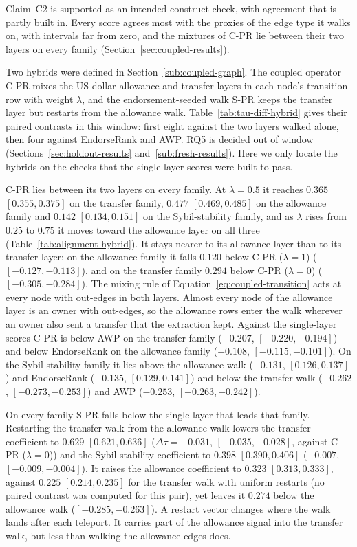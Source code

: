 Claim~C2 is supported as an intended-construct check, with agreement that is partly built in. Every score agrees most with the proxies of the edge type it walks on, with intervals far from zero, and the mixtures of C-PR lie between their two layers on every family (Section~\ref{sec:coupled-results}).


Two hybrids were defined in Section~\ref{sub:coupled-graph}. The coupled operator C-PR mixes the US-dollar allowance and transfer layers in each node's transition row with weight $\lambda$, and the endorsement-seeded walk S-PR keeps the transfer layer but restarts from the allowance walk. Table~\ref{tab:tau-diff-hybrid} gives their paired contrasts in this window: first eight against the two layers walked alone, then four against EndorseRank and AWP. RQ5 is decided out of window (Sections~\ref{sec:holdout-results} and~\ref{sub:fresh-results}). Here we only locate the hybrids on the checks that the single-layer scores were built to pass.



C-PR lies between its two layers on every family. At $\lambda=0.5$ it reaches $0.365$ $[0.355,0.375]$ on the transfer family, $0.477$ $[0.469,0.485]$ on the allowance family and $0.142$ $[0.134,0.151]$ on the Sybil-stability family, and as $\lambda$ rises from $0.25$ to $0.75$ it moves toward the allowance layer on all three (Table~\ref{tab:alignment-hybrid}). It stays nearer to its allowance layer than to its transfer layer: on the allowance family it falls $0.120$ below C-PR ($\lambda=1$) ($[-0.127,-0.113]$), and on the transfer family $0.294$ below C-PR ($\lambda=0$) ($[-0.305,-0.284]$). The mixing rule of Equation~\eqref{eq:coupled-transition} acts at every node with out-edges in both layers. Almost every node of the allowance layer is an owner with out-edges, so the allowance rows enter the walk wherever an owner also sent a transfer that the extraction kept. Against the single-layer scores C-PR is below AWP on the transfer family ($-0.207$, $[-0.220,-0.194]$) and below EndorseRank on the allowance family ($-0.108$, $[-0.115,-0.101]$). On the Sybil-stability family it lies above the allowance walk ($+0.131$, $[0.126,0.137]$) and EndorseRank ($+0.135$, $[0.129,0.141]$) and below the transfer walk ($-0.262$, $[-0.273,-0.253]$) and AWP ($-0.253$, $[-0.263,-0.242]$).

On every family S-PR falls below the single layer that leads that family. Restarting the transfer walk from the allowance walk lowers the transfer coefficient to $0.629$ $[0.621,0.636]$ ($\Delta\tau=-0.031$, $[-0.035,-0.028]$, against C-PR ($\lambda=0$)) and the Sybil-stability coefficient to $0.398$ $[0.390,0.406]$ ($-0.007$, $[-0.009,-0.004]$). It raises the allowance coefficient to $0.323$ $[0.313,0.333]$, against $0.225$ $[0.214,0.235]$ for the transfer walk with uniform restarts (no paired contrast was computed for this pair), yet leaves it $0.274$ below the allowance walk ($[-0.285,-0.263]$). A restart vector changes where the walk lands after each teleport. It carries part of the allowance signal into the transfer walk, but less than walking the allowance edges does.


